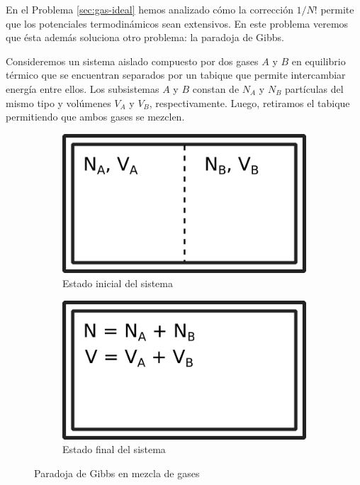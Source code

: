 \documentclass[a4paper,11pt]{article}
\begin{document}
En el Problema \ref{sec:gas-ideal} hemos analizado cómo la corrección $1/N!$ 
permite que los potenciales termodinámicos sean extensivos. En este problema 
veremos que ésta además soluciona otro problema: la paradoja de Gibbs.

Consideremos un sistema aislado compuesto por dos gases $A$ y $B$ en 
equilibrio térmico que se encuentran separados por un tabique que 
permite intercambiar energía entre ellos.
Los subsistemas $A$ y $B$ constan de $N_A$ y $N_B$ partículas del mismo 
tipo y volúmenes $V_A$ y $V_B$, respectivamente.
Luego, retiramos el tabique permitiendo que ambos gases se mezclen.

\begin{figure}[h!]
    \centering
    \begin{subfigure}[b]{0.3\textwidth}
        \includegraphics[width=\textwidth]{figs/paradoja-gibbs-1.png}
        \caption{Estado inicial del sistema}
        \label{fig:gibbs-tabique}
    \end{subfigure}
    \hspace{0.1\textwidth}
    \begin{subfigure}[b]{0.3\textwidth}
        \includegraphics[width=\textwidth]{figs/paradoja-gibbs-2.png}
        \caption{Estado final del sistema}
        \label{fig:gibbs-mezcla}
    \end{subfigure}
    \caption{Paradoja de Gibbs en mezcla de gases}
\end{figure}
\end{document}
